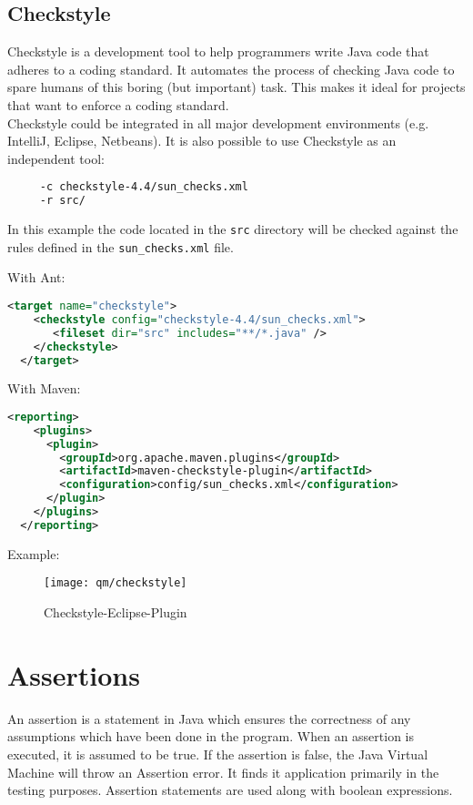 \subsection{Checkstyle}
Checkstyle is a development tool to help programmers write Java
code that adheres to a coding standard. It automates the process
of checking Java code to spare humans of this boring (but important)
task. This makes it ideal for projects that want to enforce a
coding standard.\\
Checkstyle could be integrated in all major development environments
(e.g. IntelliJ, Eclipse, Netbeans). It is also possible to use
Checkstyle as an independent tool:
 \begin{lstlisting}[language=csh]
% java -jar checkstyle-all-4.4.jar \
     -c checkstyle-4.4/sun_checks.xml
     -r src/
 \end{lstlisting}
 In this example the code located in the \verb|src| directory will be
 checked against the rules defined in the \verb|sun_checks.xml| file.

 \vspace{3mm}

With Ant:
\begin{lstlisting}[language=xml]
  <target name="checkstyle">
    <checkstyle config="checkstyle-4.4/sun_checks.xml">
       <fileset dir="src" includes="**/*.java" />
    </checkstyle>
  </target>
\end{lstlisting}

\vspace{3mm}

With Maven:
\begin{lstlisting}[language=xml,
  morekeywords={reporting,plugins,plugin,groupId,artifactId,configuration}]
  <reporting>
    <plugins>
      <plugin>
        <groupId>org.apache.maven.plugins</groupId>
        <artifactId>maven-checkstyle-plugin</artifactId>
        <configuration>config/sun_checks.xml</configuration>
      </plugin>
    </plugins>
  </reporting>
\end{lstlisting}
\newpage

Example:
\begin{figure}[H]
\texttt{[image: qm/checkstyle]}
\caption{Checkstyle-Eclipse-Plugin}
\end{figure}
%
\newslide
\section{Assertions}
An assertion is a statement in Java which ensures the correctness of
any assumptions which have been done in the program. When an assertion
is executed, it is assumed to be true. If the assertion is false,
the Java Virtual Machine will throw an Assertion error. It finds it application
primarily in the testing purposes. Assertion statements are used
along with boolean expressions.


